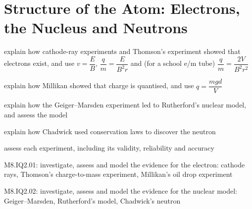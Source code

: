 %
\newcommand\chTwoNuc[3]{\ensuremath{\mathord{%
  \setbox0=\hbox{$\scriptstyle#1$}\setbox2=\hbox{$\scriptstyle#2$}%
  \ifdim\wd0<\wd2 \setbox0=\hbox to\wd2{\hss\box0}\else\setbox2=\hbox to\wd0{\hss\box2}\fi
  {}^{\box0}_{\box2}\mathrm{#3}}}}
\chapter[Structure of the Atom]{Structure of the Atom: Electrons, the Nucleus and Neutrons}\label{ch2:chap}


\begin{goals}
  \item explain how cathode-ray experiments and Thomson's experiment showed that
        electrons exist, and use $v = \dfrac{E}{B}$, $\dfrac{q}{m} = \dfrac{E}{B^2 r}$
        and (for a school e/m tube) $\dfrac{q}{m} = \dfrac{2V}{B^2 r^2}$
  \item explain how Millikan showed that charge is quantised, and use
        $q = \dfrac{mgd}{V}$
  \item explain how the Geiger--Marsden experiment led to Rutherford's nuclear
        model, and assess the model
  \item explain how Chadwick used conservation laws to discover the neutron
  \item assess each experiment, including its validity, reliability and accuracy
\end{goals}

\begin{syllabus}
  \item M8.IQ2.01: investigate, assess and model the evidence for the electron:
        cathode rays, Thomson's charge-to-mass experiment, Millikan's oil drop experiment
  \item M8.IQ2.02: investigate, assess and model the evidence for the nuclear
        model: Geiger--Marsden, Rutherford's model, Chadwick's neutron
\end{syllabus}


